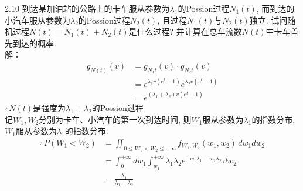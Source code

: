 2.10 到达某加油站的公路上的卡车服从参数为${\lambda}_1$的Possion过程$N_1(t)$, 而到达的小汽车服从参数为${\lambda}_2$的Possion过程$N_2(t)$, 且过程$N_1(t)$与$N_2(t)$独立. 试问随机过程$N(t) = N_1(t) + N_2(t)$是什么过程? 并计算在总车流数$N(t)$中卡车首先到达的概率. \\
解：
\[
\begin{split}
g_{N(t)}(v) & = g_{N_1{t}}(v) \cdot g_{N_2{t}}(v)\\
		& = e^{\lambda_1 v(e^t-1)}e^{\lambda_2 v(e^t-1)}\\
		& = e^{(\lambda_1 +\lambda_2)v(e^t-1)}
\end{split}
\]
$\therefore N(t)$是强度为$\lambda_1+\lambda_2$的Possion过程\\
记$W_1,W_2$分别为卡车、小汽车的第一次到达时间, 则$W_1$服从参数为$\lambda_1$的指数分布, $W_1$服从参数为$\lambda_1$的指数分布.
\[
\begin{split}
\therefore P(W_1 < W_2) & = \iint_{0 \leqslant W_1 < W_2 \leqslant +\infty}f_{W_1,W_2}(w_1,w_2)\,dw_1dw_2\\
					& = \int^{+\infty}_0dw_1\int^{+\infty}_{w_1}\lambda_1\lambda_2e^{-w_1\lambda_1-w_2\lambda_2}\,dw_2\\
					& = \frac{\lambda_1}{\lambda_1+\lambda_2}
\end{split}
\]


